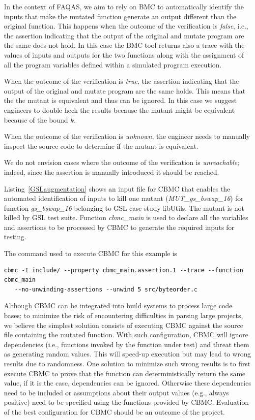 In the context of FAQAS, we aim to rely on BMC to automatically identify the inputs that make the mutated function generate an output different than the original function. This happens when the outcome of the verification is \emph{false}, i.e., the assertion indicating that the output of the original and mutate program are the same does not hold. In this case the BMC tool returns also a trace with the values of inputs and outputs for the two functions along with the assignment of all the program variables defined within a simulated program execution.

When the outcome of the verification is \emph{true}, the assertion indicating that the output of the original and mutate program are the same holds. This means that the the mutant is equivalent and thus can be ignored. In this case we suggest engineers to double heck the results because the mutant might be equivalent because of  the bound $k$.

When the outcome of the verification is \emph{unknown}, the engineer needs to manually inspect the source code to determine if the mutant is equivalent.

We do not envision cases where the outcome of the verification is \emph{unreachable}; indeed, since the assertion is manually introduced it should be reached.





Listing~\ref{GSLaugmentation} shows an input file for CBMC that enables the automated identification of inputs to kill one mutant (\emph{MUT\_gs\_bswap\_16}) for function \emph{gs\_bswap\_16} belonging to GSL case study libUtils. The mutant 
is not killed by GSL test suite. Function \emph{cbmc\_main} is used to declare all the variables and assertions to be processed by CBMC to generate the required inputs for testing.

The command used to execute CBMC for this example is
\begin{verbatim}
cbmc -I include/ --property cbmc_main.assertion.1 --trace --function cbmc_main 
   --no-unwinding-assertions --unwind 5 src/byteorder.c
\end{verbatim}

Although CBMC can be integrated into build systems to process large code bases; to minimize the risk of encountering difficulties in parsing large projects, we believe the simplest solution consists of executing CBMC against the source file containing the mutated function. With such configuration, CBMC will ignore dependencies (i.e., functions invoked by the function under test) and threat them as generating random values. This will speed-up execution but may lead to wrong results due to randomness. One solution to minimize such wrong results is to first execute CBMC to prove that the function can deterministically return the same value, if it is the case, dependencies can be ignored. Otherwise these dependencies need to be included or assumptions about their output values (e.g., always positive) need to be specified using the functions provided by CBMC. Evaluation of the best configuration for CBMC should be an outcome of the project.

